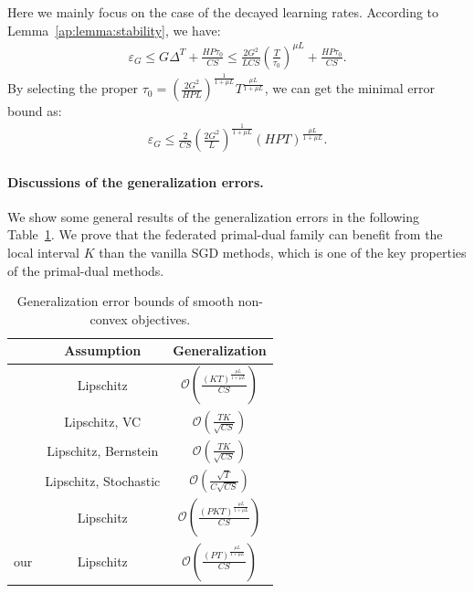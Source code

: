 Here we mainly focus on the case of the decayed learning rates. According to Lemma~\ref{ap:lemma:stability}, we have:
\begin{align*}
    \varepsilon_G \leq G\Delta^T + \frac{HP\tau_0}{CS} \leq \frac{2G^2}{LCS}\left(\frac{T}{\tau_0}\right)^{\mu L} + \frac{HP\tau_0}{CS}.
\end{align*}
By selecting the proper $\tau_0=\left(\frac{2G^2}{HPL}\right)^{\frac{1}{1+\mu L}}T^{\frac{\mu L }{1+\mu L}}$, we can get the minimal error bound as:
\begin{align*}
    \varepsilon_G \leq \frac{2}{CS}\left(\frac{2G^2}{L}\right)^{\frac{1}{1+\mu L}} \left(HPT\right)^{\frac{\mu L}{1+\mu L}}.
\end{align*}


\paragraph{Discussions of the generalization errors.}
\label{ap:gen discussion}
We show some general results of the generalization errors in the following Table~\ref{tb:comparison}. We prove that the federated primal-dual family can benefit from the local interval $K$ than the vanilla SGD methods, which is one of the key properties of the primal-dual methods.

\begin{table}[H]
\centering
\caption{Generalization error bounds of smooth non-convex objectives.}
\label{tb:comparison}
\small
\begin{tabular}{ccc}
\toprule
& Assumption & Generalization \\ 
\midrule
\citet{hardt2016train} & Lipschitz & $\mathcal{O}(\frac{(KT)^{\frac{\mu L}{1 + \mu L}}}{CS})$ \\
\midrule
\citet{mohri2019agnostic} & Lipschitz, VC & $\mathcal{O}(\frac{TK}{\sqrt{CS}})$ \\
\citet{hu2022generalization} & Lipschitz, Bernstein & $\mathcal{O}(\frac{TK}{\sqrt{CS}})$ \\
\citet{wu2023information} & Lipschitz, Stochastic & $\mathcal{O}(\frac{\sqrt{T}}{C\sqrt{CS}})$\\
\citet{sun2023mode} & Lipschitz & $\mathcal{O}(\frac{(PKT)^\frac{\mu L}{1 + \mu L}}{CS})$ \\
\midrule
our & Lipschitz & $\mathcal{O}(\frac{(PT)^\frac{\mu L}{1 + \mu L}}{CS})$ \\
\bottomrule
\end{tabular}
\end{table}
